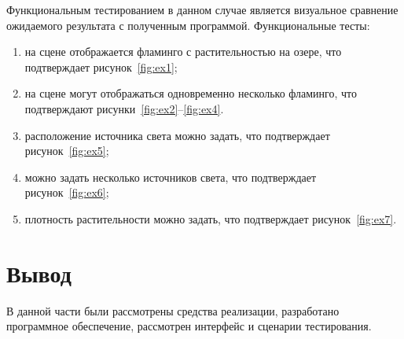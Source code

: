 Функциональным тестированием в данном случае является визуальное сравнение ожидаемого результата с полученным программой.
Функциональные тесты:
\begin{enumerate}[label=\arabic*)]
	\item на сцене отображается фламинго с растительностью на озере, что подтверждает рисунок~\ref{fig:ex1};
	\item на сцене могут отображаться одновременно несколько фламинго, что подтверждают рисунки~\ref{fig:ex2}--\ref{fig:ex4}.
	\item расположение источника света можно задать, что подтверждает рисунок~\ref{fig:ex5};
	\item можно задать несколько источников света, что подтверждает рисунок~\ref{fig:ex6};
	\item плотность растительности можно задать, что подтверждает рисунок~\ref{fig:ex7}. 
\end{enumerate}


\section*{Вывод}

В данной части были рассмотрены средства реализации, разработано программное обеспечение, рассмотрен интерфейс и сценарии тестирования.